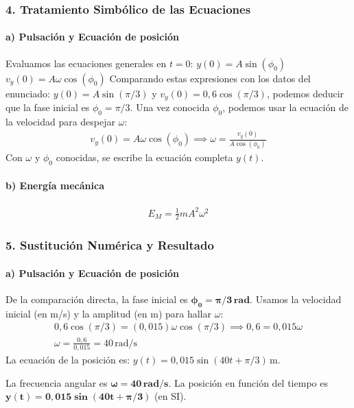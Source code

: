 \subsubsection*{4. Tratamiento Simbólico de las Ecuaciones}
\paragraph{a) Pulsación y Ecuación de posición}
Evaluamos las ecuaciones generales en $t=0$:
$y(0) = A\sin(\phi_0)$
$v_y(0) = A\omega\cos(\phi_0)$
Comparando estas expresiones con los datos del enunciado:
$y(0) = A\sin(\pi/3)$ y $v_y(0) = 0,6\cos(\pi/3)$, podemos deducir que la fase inicial es $\phi_0 = \pi/3$.
Una vez conocida $\phi_0$, podemos usar la ecuación de la velocidad para despejar $\omega$:
\begin{gather}
    v_y(0) = A\omega\cos(\phi_0) \implies \omega = \frac{v_y(0)}{A\cos(\phi_0)}
\end{gather}
Con $\omega$ y $\phi_0$ conocidas, se escribe la ecuación completa $y(t)$.

\paragraph{b) Energía mecánica}
\begin{gather}
    E_M = \frac{1}{2}m A^2 \omega^2
\end{gather}

\subsubsection*{5. Sustitución Numérica y Resultado}
\paragraph{a) Pulsación y Ecuación de posición}
De la comparación directa, la fase inicial es $\boldsymbol{\phi_0 = \pi/3\,\textbf{rad}}$.
Usamos la velocidad inicial (en m/s) y la amplitud (en m) para hallar $\omega$:
\begin{gather}
    0,6\cos(\pi/3) = (0,015)\omega\cos(\pi/3) \implies 0,6 = 0,015 \omega \nonumber \\
    \omega = \frac{0,6}{0,015} = 40\,\text{rad/s}
\end{gather}
La ecuación de la posición es:
$y(t) = 0,015\sin(40t + \pi/3)\,\text{m}$.
\begin{cajaresultado}
La frecuencia angular es $\boldsymbol{\omega = 40\,\textbf{rad/s}}$.
La posición en función del tiempo es $\boldsymbol{y(t) = 0,015\sin(40t + \pi/3)}$ (en SI).
\end{cajaresultado}

